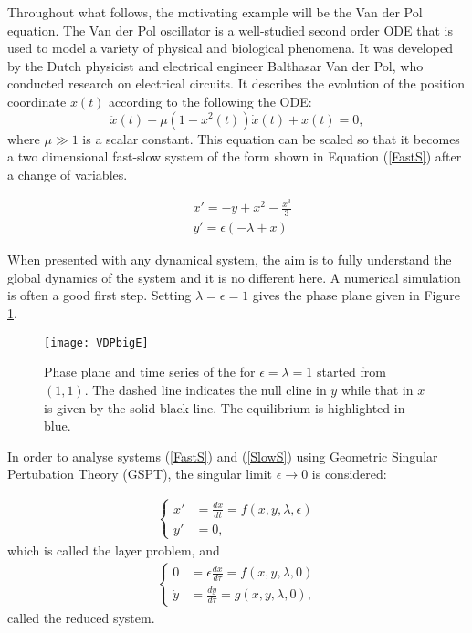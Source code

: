 Throughout what follows, the motivating example will be the Van der Pol equation. The Van der Pol oscillator is a well-studied second order ODE that is used to model a variety of physical and biological phenomena. It was developed by the Dutch physicist and electrical engineer Balthasar Van der Pol, who conducted research on electrical circuits. It describes the evolution of the position coordinate \(x(t)\) according to the following the ODE:
\begin{equation} \label{eq:vdP}
\ddot{x}(t)-\mu\left(1-x^2(t)\right)\dot{x}(t)+x(t)=0,
\end{equation}
where \(\mu \gg 1\) is a scalar constant. This equation can be scaled so that it becomes a two dimensional fast-slow system of the form shown in Equation (\ref{FastS}) after a change of variables.

\begin{equation}
\begin{aligned}
&x'=-y+x^2-\frac{x^3}{3} \\
&y'=\epsilon(-\lambda+x)
\end{aligned}
\label{eq: canonical}
\end{equation}

When presented with any dynamical system, the aim is to fully understand the global dynamics of the system and it is no different here. A numerical simulation is often a good first step. Setting $\lambda=\epsilon=1$ gives the phase plane given in Figure \ref{fig:VDPE1}.
\begin{figure}[h]
	\texttt{[image: VDPbigE]}
	\caption{Phase plane and time series of the \vdp for $\epsilon=\lambda=1$ started from $(1,1)$. The dashed line indicates the null cline in $y$ while that in $x$ is given by the solid black line. The equilibrium is highlighted in blue.}
	\label{fig:VDPE1}
\end{figure}







In order to analyse systems (\ref{FastS}) and (\ref{SlowS}) using Geometric Singular Pertubation Theory (GSPT), the singular limit $\epsilon \to 0$ is considered:

\begin{align} \label{FastS0}
\begin{cases}
x' &=\frac{dx}{dt}= f(x,y,\lambda, \epsilon)\\
y' &= 0,
\end{cases}
\end{align}
which is called the layer problem, and
\begin{align}\label{SlowS0}
\begin{cases}
0 &= \epsilon \frac{dx}{d \tau} = f(x,y,\lambda, 0)\\
\dot{y} & = \frac{dy}{d \tau} =  g( x,y, \lambda,0),
\end{cases}
\end{align}
called the reduced system.\\


